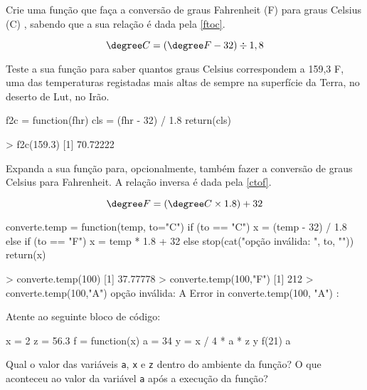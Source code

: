 \documentclass{exam}
\begin{document}
\begin{questions}
	\question Crie uma função que faça a conversão de graus Fahrenheit (\degree F) para graus Celsius (\degree C) , sabendo que a sua relação é dada pela \autoref{ftoc}.
	
	\begin{equation}
	\label{ftoc}
		\degree C = (\degree F - 32) \div 1,8	
	\end{equation}
	
	Teste a sua função para saber quantos graus Celsius correspondem a 159,3 \degree F, uma das temperaturas registadas mais altas de sempre na superfície da Terra, no deserto de Lut, no Irão.
	
	\begin{solution}
		\begin{rcode}
			f2c = function(fhr) {
				cls = (fhr - 32) / 1.8
				return(cls)
			}
			
			> f2c(159.3)
			[1] 70.72222
		\end{rcode}
	\end{solution}
	
	\question Expanda a sua função para, opcionalmente, também fazer a conversão de graus Celsius para Fahrenheit. A relação inversa é dada pela \autoref{ctof}.
	
	\begin{equation}
	\label{ctof}
		\degree F = (\degree C \times 1.8) + 32
	\end{equation}
	
	\begin{solution}
		\begin{rcode}
			converte.temp = function(temp, to="C") {
				if (to == "C") {
					x = (temp - 32) / 1.8
				} else if (to == "F") {
					x = temp * 1.8 + 32
				} else {
					stop(cat("opção inválida: ", to, "\n"))
				}
				return(x)
			}
			
			> converte.temp(100)
			[1] 37.77778
			> converte.temp(100,"F")
			[1] 212
			> converte.temp(100,"A")
			opção inválida:  A 
			Error in converte.temp(100, "A") : 
		\end{rcode}
	\end{solution}
	
	\question Atente ao seguinte bloco de código:
		\begin{rcode}
			x = 2
			z = 56.3
			f = function(x) {
			      a = 34
			      y = x / 4 * a * z
			      y
			    }
			f(21)
			a
		\end{rcode}
	Qual o valor das variáveis \texttt{a}, \texttt{x} e \texttt{z} dentro do ambiente da função? O que aconteceu ao valor da variável \texttt{a} após a execução da função?
	

\end{questions}
\end{document}

